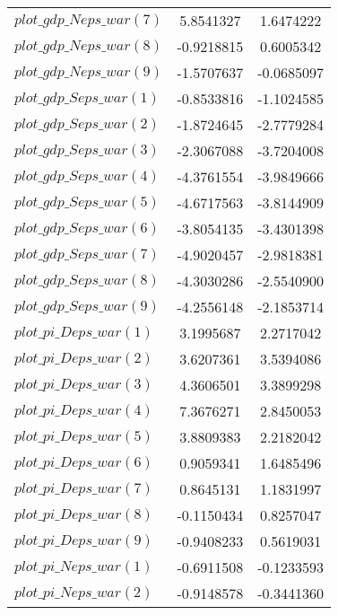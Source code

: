 \begin{center}
\begin{longtable}{lcc}
$plot\_gdp\_N eps\_war (7)  $	 & 	      5.8541327	 & 	      1.6474222 \\ 
$plot\_gdp\_N eps\_war (8)  $	 & 	     -0.9218815	 & 	      0.6005342 \\ 
$plot\_gdp\_N eps\_war (9)  $	 & 	     -1.5707637	 & 	     -0.0685097 \\ 
$plot\_gdp\_S eps\_war (1)  $	 & 	     -0.8533816	 & 	     -1.1024585 \\ 
$plot\_gdp\_S eps\_war (2)  $	 & 	     -1.8724645	 & 	     -2.7779284 \\ 
$plot\_gdp\_S eps\_war (3)  $	 & 	     -2.3067088	 & 	     -3.7204008 \\ 
$plot\_gdp\_S eps\_war (4)  $	 & 	     -4.3761554	 & 	     -3.9849666 \\ 
$plot\_gdp\_S eps\_war (5)  $	 & 	     -4.6717563	 & 	     -3.8144909 \\ 
$plot\_gdp\_S eps\_war (6)  $	 & 	     -3.8054135	 & 	     -3.4301398 \\ 
$plot\_gdp\_S eps\_war (7)  $	 & 	     -4.9020457	 & 	     -2.9818381 \\ 
$plot\_gdp\_S eps\_war (8)  $	 & 	     -4.3030286	 & 	     -2.5540900 \\ 
$plot\_gdp\_S eps\_war (9)  $	 & 	     -4.2556148	 & 	     -2.1853714 \\ 
$plot\_pi\_D eps\_war (1)   $	 & 	      3.1995687	 & 	      2.2717042 \\ 
$plot\_pi\_D eps\_war (2)   $	 & 	      3.6207361	 & 	      3.5394086 \\ 
$plot\_pi\_D eps\_war (3)   $	 & 	      4.3606501	 & 	      3.3899298 \\ 
$plot\_pi\_D eps\_war (4)   $	 & 	      7.3676271	 & 	      2.8450053 \\ 
$plot\_pi\_D eps\_war (5)   $	 & 	      3.8809383	 & 	      2.2182042 \\ 
$plot\_pi\_D eps\_war (6)   $	 & 	      0.9059341	 & 	      1.6485496 \\ 
$plot\_pi\_D eps\_war (7)   $	 & 	      0.8645131	 & 	      1.1831997 \\ 
$plot\_pi\_D eps\_war (8)   $	 & 	     -0.1150434	 & 	      0.8257047 \\ 
$plot\_pi\_D eps\_war (9)   $	 & 	     -0.9408233	 & 	      0.5619031 \\ 
$plot\_pi\_N eps\_war (1)   $	 & 	     -0.6911508	 & 	     -0.1233593 \\ 
$plot\_pi\_N eps\_war (2)   $	 & 	     -0.9148578	 & 	     -0.3441360 \\ 

\end{longtable}
\end{center}
